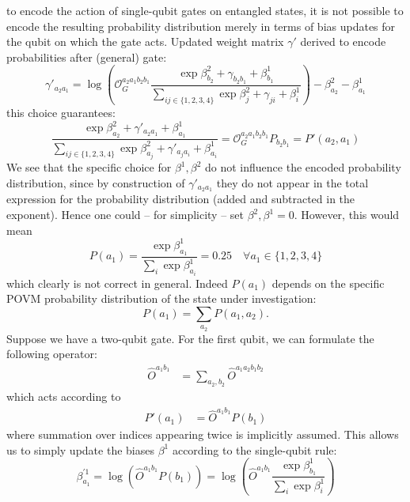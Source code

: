 \documentclass[a4]{article}
\begin{document}
 to encode the action of single-qubit gates on entangled states, it is not
 possible to encode the resulting probability distribution merely in terms of
 bias updates for the qubit on which the gate acts.
Updated weight matrix $\gamma'$ derived to encode probabilities after (general)
 gate:
\begin{equation*}
    \gamma'_{a_2 a_1} = \log{\left( \mathcal{O}_G^{a_2a_1b_2b_1}
     \frac{\exp{\beta^2_{b_2} + \gamma_{b_2 b_1} + \beta^1_{b_1}}}{
     \sum_{ij\in\{ 1,2,3,4\}} \exp{\beta^2_j + \gamma_{ji} + \beta^1_i}}
     \right)} - \beta^2_{a_2} - \beta^1_{a_1}
\end{equation*}
this choice guarantees:
\begin{equation*}
    \frac{\exp{\beta^2_{a_2} + \gamma'_{a_2a_1} + \beta^1_{a_1}}}{
    \sum_{ij\in\{ 1,2,3,4\}} \exp{\beta^2_{a_j} + \gamma'_{a_ja_i} +
    \beta^1_{a_i}}} = \mathcal{O}_G^{a_2a_1b_2b_1} P_{b_2b_1} = P'(a_2,a_1)
\end{equation*}
We see that the specific choice for $\beta^1,\beta^2$ do not influence the
encoded probability distribution, since by construction of $\gamma'_{a_2a_1}$
they do not appear in the total expression for the probability distribution
(added and subtracted in the exponent). Hence one could -- for simplicity --
set $\beta^2,\beta^1=0$. However, this would mean
\begin{equation*}
    P(a_1) = \frac{\exp{\beta^1_{a_1}}}{\sum_i \exp{\beta^1_{a_i}}} = 0.25
    \quad \forall a_1 \in \{1,2,3,4\}
\end{equation*}
which clearly is not correct in general. Indeed $P(a_1)$ depends on the specific
 POVM probability distribution of the state under investigation:
\begin{equation*}
    P(a_1) = \sum_{a_2}P(a_1,a_2).
\end{equation*}
Suppose we have a two-qubit gate. For the first qubit, we can formulate the
 following operator:
\begin{align}
    \hat{O}^{a_1 b_1} &= \sum_{a_2,b_2} \hat{O}^{a_1a_2b_1b_2}
\end{align}
which acts according to
\begin{align}
    P'(a_1) &= \hat{O}^{a_1 b_1} P(b_1)
\end{align}
where summation over indices appearing twice is implicitly assumed. This allows
us to simply update the biases $\beta^1$ according to the single-qubit rule:
\begin{equation*}
    \beta^{'1}_{a_1} = \log{\left(\hat{O}^{a_1 b_1} P(b_1) \right)} =
     \log{\left(\hat{O}^{a_1 b_1} \frac{\exp{\beta^1_{b_1}}}{\sum_{i}
      \exp{\beta^1_i}} \right)}
\end{equation*}
\end{document}
